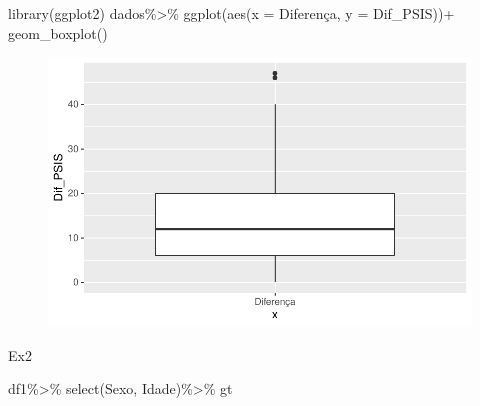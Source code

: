 \documentclass[
  letterpaper,
  DIV=11,
  numbers=noendperiod]{scrartcl}
\newenvironment{Shaded}{\begin{snugshade}}{\end{snugshade}}
\newcommand{\AttributeTok}[1]{\textcolor[rgb]{0.40,0.45,0.13}{#1}}
\newcommand{\FunctionTok}[1]{\textcolor[rgb]{0.28,0.35,0.67}{#1}}
\newcommand{\NormalTok}[1]{\textcolor[rgb]{0.00,0.23,0.31}{#1}}
\newcommand{\SpecialCharTok}[1]{\textcolor[rgb]{0.37,0.37,0.37}{#1}}
\newcommand{\StringTok}[1]{\textcolor[rgb]{0.13,0.47,0.30}{#1}}
\begin{document}
\begin{Shaded}
\begin{Highlighting}[]
\FunctionTok{library}\NormalTok{(ggplot2)}
\NormalTok{dados}\SpecialCharTok{\%\textgreater{}\%}
  \FunctionTok{ggplot}\NormalTok{(}\FunctionTok{aes}\NormalTok{(}\AttributeTok{x =} \StringTok{\textquotesingle{}Diferença\textquotesingle{}}\NormalTok{, }\AttributeTok{y =}\NormalTok{ Dif\_PSIS))}\SpecialCharTok{+}
  \FunctionTok{geom\_boxplot}\NormalTok{()}
\end{Highlighting}
\end{Shaded}

\begin{figure}[H]

{\centering \includegraphics{v1_files/figure-pdf/unnamed-chunk-7-1.pdf}

}

\end{figure}

Ex2

\begin{Shaded}
\begin{Highlighting}[]
\NormalTok{df1}\SpecialCharTok{\%\textgreater{}\%}
  \FunctionTok{select}\NormalTok{(Sexo, Idade)}\SpecialCharTok{\%\textgreater{}\%}
\NormalTok{  gt}
\end{Highlighting}
\end{Shaded}
\end{document}
